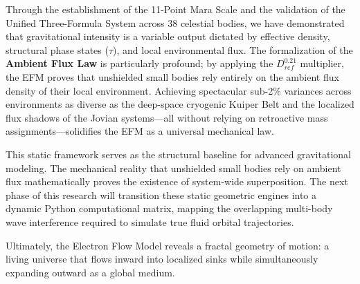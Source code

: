 \documentclass[11pt, a4paper]{article}
\begin{document}
Through the establishment of the 11-Point Mara Scale and the validation of the Unified Three-Formula System across 38 celestial bodies, we have demonstrated that gravitational intensity is a variable output dictated by effective density, structural phase states ($\tau$), and local environmental flux. The formalization of the \textbf{Ambient Flux Law} is particularly profound; by applying the $D_{ref}^{0.21}$ multiplier, the EFM proves that unshielded small bodies rely entirely on the ambient flux density of their local environment. Achieving spectacular sub-2\% variances across environments as diverse as the deep-space cryogenic Kuiper Belt and the localized flux shadows of the Jovian systems---all without relying on retroactive mass assignments---solidifies the EFM as a universal mechanical law.

This static framework serves as the structural baseline for advanced gravitational modeling. The mechanical reality that unshielded small bodies rely on ambient flux mathematically proves the existence of system-wide superposition. The next phase of this research will transition these static geometric engines into a dynamic Python computational matrix, mapping the overlapping multi-body wave interference required to simulate true fluid orbital trajectories.

Ultimately, the Electron Flow Model reveals a fractal geometry of motion: a living universe that flows inward into localized sinks while simultaneously expanding outward as a global medium.

\clearpage
\appendix
\end{document}
